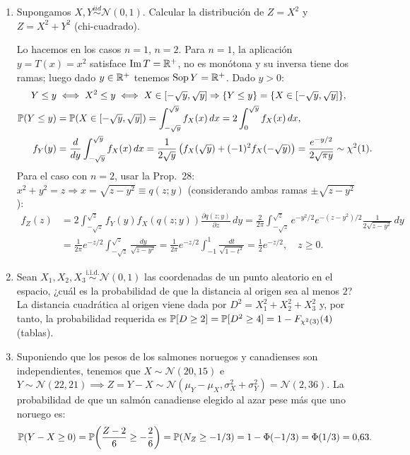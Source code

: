 \begin{enumerate}
  \item Supongamos $X,Y\overset{iid}{\sim} \mathcal{N}(0,1)$. Calcular la distribuci\'on de $Z=X^2$ y $Z=X^2+Y^2$ (chi-cuadrado). 
  
        Lo hacemos en los casos $n = 1$, $n = 2$.
        Para $n = 1$, la aplicación $y = T(x) = x^2$ satisface $\operatorname{Im} T = \mathbb{R}^+$, no es monótona y su inversa tiene dos ramas; luego dado $y \in \mathbb{R}^+$ tenemos $\operatorname{Sop} Y = \mathbb{R}^+$. Dado $y > 0$:
        \begin{align*}
          Y \le y &\iff X^2 \le y \iff X \in [-\sqrt{y}, \sqrt{y}] \Rightarrow \{Y \le y\} = \{X \in [-\sqrt{y}, \sqrt{y}]\}, \\
          \mathbb{P}(Y \le y) &= \mathbb{P}(X \in [-\sqrt{y}, \sqrt{y}]) = \int_{-\sqrt{y}}^{\sqrt{y}} f_X(x)\,dx = 2\int_0^{\sqrt{y}} f_X(x)\,dx, \\
          f_Y(y) &= \frac{d}{dy}\int_{-\sqrt{y}}^{\sqrt{y}} f_X(x)\,dx = \frac{1}{2\sqrt{y}}\left(f_X(\sqrt{y}) + (-1)^2 f_X(-\sqrt{y})\right) = \frac{e^{-y/2}}{2\sqrt{\pi y}} \sim \chi^2(1).
        \end{align*}
        Para el caso con $n = 2$, usar la Prop.\ 28: $x^2 + y^2 = z \Rightarrow x = \sqrt{z - y^2} \equiv q(z; y)$ (considerando ambas ramas $\pm\sqrt{z-y^2}$):
        \begin{align*}
          f_Z(z) &= 2\int_{-\sqrt{z}}^{\sqrt{z}} f_Y(y) f_X(q(z; y)) \frac{\partial q(z; y)}{\partial z}\,dy = \frac{2}{2\pi}\int_{-\sqrt{z}}^{\sqrt{z}} e^{-y^2/2} e^{-(z - y^2)/2} \frac{1}{2\sqrt{z - y^2}}\,dy \\
                 &= \frac{1}{2\pi} e^{-z/2} \int_{-\sqrt{z}}^{\sqrt{z}} \frac{dy}{\sqrt{z - y^2}} = \frac{1}{2\pi} e^{-z/2} \int_{-1}^1 \frac{dt}{\sqrt{1 - t^2}} = \frac{1}{2}e^{-z/2}, \quad z \ge 0.
        \end{align*}

  \item Sean $X_1, X_2, X_3 \stackrel{\text{i.i.d.}}{\sim} \mathcal{N}(0,1)$ las coordenadas de un punto aleatorio en el espacio, ¿cuál es la probabilidad de que la distancia al origen sea al menos $2$? \\ 
  La distancia cuadrática al origen viene dada por $D^2 = X_1^2 + X_2^2 + X_3^2$ y, por tanto, la probabilidad requerida es $\mathbb{P}[D \ge 2] = \mathbb{P}[D^2 \ge 4] = 1 - F_{\chi^2(3)}(4)$ (tablas).

  \item Suponiendo que los pesos de los salmones noruegos y canadienses son independientes, tenemos que $X \sim \mathcal{N}(20, 15)$ e $Y \sim \mathcal{N}(22, 21) \implies Z = Y - X \sim \mathcal{N}(\mu_Y - \mu_X, \sigma_X^2 + \sigma_Y^2) = \mathcal{N}(2, 36)$. La probabilidad de que un salmón canadiense elegido al azar pese más que uno noruego es:
        \[
          \mathbb{P}(Y - X \ge 0) = \mathbb{P}\!\left(\frac{Z - 2}{6} \ge -\frac{2}{6}\right) = \mathbb{P}(N_Z \ge -1/3) = 1 - \Phi(-1/3) = \Phi(1/3) = 0{,}63.
        \]


\end{enumerate}
